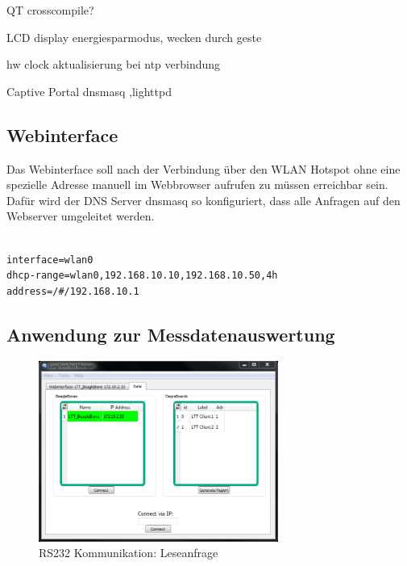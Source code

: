 QT crosscompile?



LCD display energiesparmodus, wecken durch geste


hw clock aktualisierung bei ntp verbindung



Captive Portal dnsmasq ,lighttpd



\subsection{Webinterface}

Das Webinterface soll nach der Verbindung über den WLAN Hotspot ohne eine spezielle Adresse manuell im Webbrowser aufrufen zu müssen erreichbar sein. Dafür wird der DNS Server dnsmasq so konfiguriert, dass alle Anfragen auf den Webserver umgeleitet werden.

\begin{lstlisting}[caption={MySQL Index},label=lst_MySQLIndex]

interface=wlan0
dhcp-range=wlan0,192.168.10.10,192.168.10.50,4h
address=/#/192.168.10.1

\end{lstlisting}


\subsection{Anwendung zur Messdatenauswertung}

\begin{figure}[H]
\begin{center}
\includegraphics[width=0.7\textwidth ]{img/general/PCClientMain.PNG}
\caption{RS232 Kommunikation: Leseanfrage}
\label{figure_RS232Kommunikation}
\end{center}
\end{figure}


